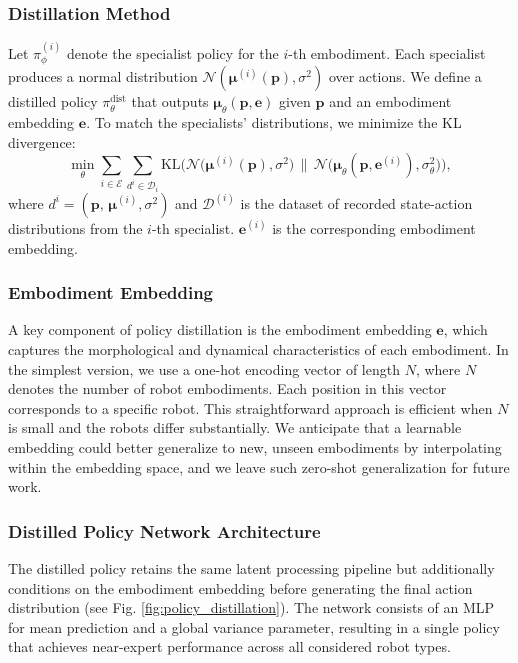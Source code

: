 \documentclass[letterpaper, 10 pt,conference]{ieeeconf}
\begin{document}
\subsubsection{Distillation Method}
Let $\pi_\phi^{(i)}$ denote the specialist policy for the $i$-th embodiment. Each specialist produces a normal distribution $\mathcal{N}(\boldsymbol{\mu}^{(i)}(\mathbf{p}), \sigma^2)$ over actions. We define a distilled policy $\pi_{\theta}^{\text{dist}}$ that outputs $\boldsymbol{\mu}_\theta(\mathbf{p}, \mathbf{e})$ given $\mathbf{p}$ and an embodiment embedding $\mathbf{e}$. To match the specialists’ distributions, we minimize the KL divergence:
\[
    \min_{\theta} \sum_{i \in \mathcal{E}} \sum_{ d^{i}\in \mathcal{D}_i}
    \mathrm{KL}\biggl(
        \mathcal{N}\bigl(\boldsymbol{\mu}^{(i)}(\mathbf{p}), \sigma^2\bigr)
        \,\big\|\, 
        \mathcal{N}\bigl(\boldsymbol{\mu}_\theta(\mathbf{p}, \mathbf{e}^{(i)}), \sigma_\theta^2\bigr)
    \biggr),
\]
where $d^{i}=(\mathbf{p},\, \boldsymbol{\mu}^{(i)}, \sigma^2)$ and $\mathcal{D}^{(i)}$ is the dataset of recorded state-action distributions from the $i$-th specialist. $\mathbf{e}^{(i)}$ is the corresponding embodiment embedding.

\subsubsection{Embodiment Embedding}
A key component of policy distillation is the embodiment embedding $\mathbf{e}$, which captures the morphological and dynamical characteristics of each embodiment. In the simplest version, we use a one-hot encoding vector of length $N$, where $N$ denotes the number of robot embodiments. Each position in this vector corresponds to a specific robot. This straightforward approach is efficient when $N$ is small and the robots differ substantially. We anticipate that a learnable embedding could better generalize to new, unseen embodiments by interpolating within the embedding space, and we leave such zero-shot generalization for future work.

\subsubsection{Distilled Policy Network Architecture}
The distilled policy retains the same latent processing pipeline but additionally conditions on the embodiment embedding before generating the final action distribution (see Fig. \ref{fig:policy_distillation}). The network consists of an MLP for mean prediction and a global variance parameter, resulting in a single policy that achieves near-expert performance across all considered robot types.
\end{document}
